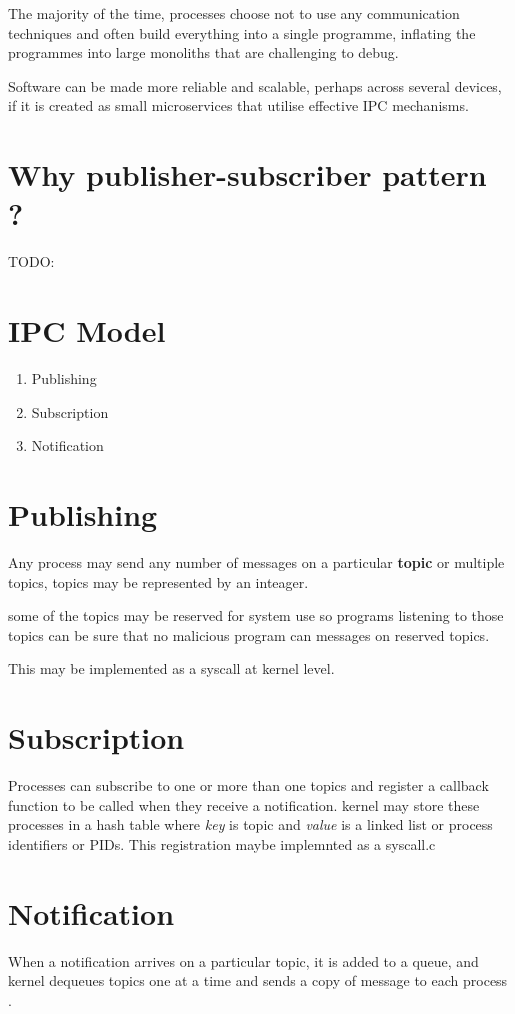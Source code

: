 \documentclass[12pt]{report}
\begin{document}
	The majority of the time, processes choose not to use any communication techniques 
	and often build everything into a single programme, inflating the programmes 
	into large monoliths that are challenging to debug.
	
	Software can be made more reliable and scalable, perhaps across several devices, 
	if it is created as small microservices that utilise effective IPC mechanisms.
	
	\section{Why publisher-subscriber pattern ?}
	
	TODO:
	
	\section{IPC Model}
	\begin{enumerate}
		\item Publishing
		\item Subscription
		\item Notification
	\end{enumerate}
	
	\section{Publishing}
	Any process may send any number of messages on a particular \textbf{topic} or 
	multiple topics, topics may be represented by an inteager.

	some of the topics may be reserved for system use so programs listening to those
	topics can be sure that no malicious program can messages on reserved topics.
	
	This may be implemented as a syscall at kernel level.
				 	
	\section{Subscription}
	Processes can subscribe to one or more than one topics and register a callback
	function to be called when they receive a notification.
	kernel may store these processes in a hash table where \textit{key} is topic 
	and \textit{value} is a linked list or process identifiers or PIDs.
	This registration maybe implemnted as a syscall.c
		
	\section{Notification}
	When a notification arrives on a particular topic, it is added to a queue,
	and kernel dequeues topics one at a time and sends a copy of message to each 
	process \cite{citation04}.
	
\end{document}
